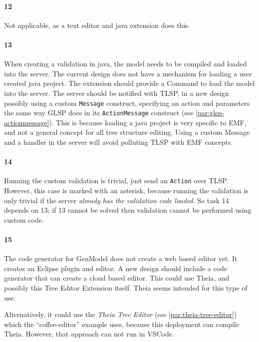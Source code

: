 \paragraph{12} Not applicable, as a text editor and java extension does this.

\paragraph{13} When creating a validation in java, the model needs to be compiled and loaded into the server.
The current design does not have a mechanism for loading a user created java project.
The extension should provide a Command to load the model into the server.
The server should be notified with \acrshort{TLSP}, in a new design possibly using a custom \texttt{Message} construct, specifying an action and parameters the same way \acrshort{GLSP} does in its \texttt{ActionMessage} construct (see \cref{par:glsp-actionmessage}).
This is because loading a java project is very specific to \acrshort{EMF}, and not a general concept for all tree structure editing.
Using a custom Message and a handler in the server will avoid polluting \acrshort{TLSP} with \acrshort{EMF} concepts.

\paragraph{14} Running the custom validation is trivial, just send an \texttt{Action} over \acrshort{TLSP}.
However, this case is marked with an asterisk, because running the validation is only trivial if the server \textit{already has the validation code loaded}.
So task 14 depends on 13; if 13 cannot be solved then validation cannot be performed using custom code.

\paragraph{15} The code generator for GenModel does not create a web based editor yet.
It creates an \gls{Eclipse} plugin and editor.
A new design should include a code generator that can create a cloud based editor.
This could use \gls{Theia}, and possibly this Tree Editor Extension itself.
Theia seems intended for this type of use.

Alternatively, it could use the \textit{Theia Tree Editor} (see \cref{par:theia-tree-editor}) which the ``coffee-editor'' example uses, because this deployment can compile \gls{Theia}.
However, that approach can not run in \gls{VSCode}.

